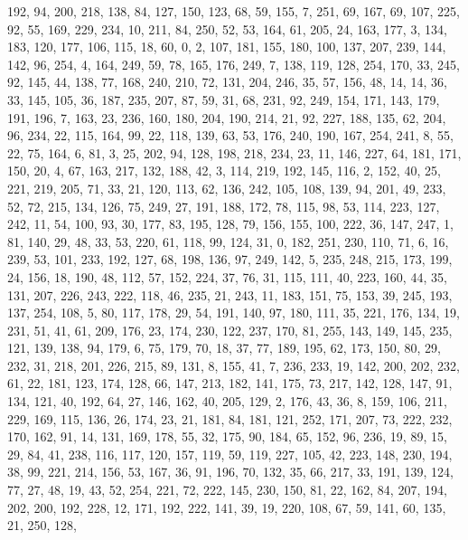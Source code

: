 \begin{DoxyCode}
       192, 94, 200, 218, 138, 84, 127, 150, 123, 68, 59, 155, 7, 251, 69, 167, 69, 107, 225, 92, 55, 169, 229, 234,
       10, 211, 84, 250, 52, 53, 164, 61, 205, 24, 163, 177, 3, 134, 183, 120, 177, 106, 115, 18, 60, 0, 2, 107,
       181, 155, 180, 100, 137, 207, 239, 144, 142, 96, 254, 4, 164, 249, 59, 78, 165, 176, 249, 7, 138, 119, 128,
       254, 170, 33, 245, 92, 145, 44, 138, 77, 168, 240, 210, 72, 131, 204, 246, 35, 57, 156, 48, 14, 14, 36, 33,
       145, 105, 36, 187, 235, 207, 87, 59, 31, 68, 231, 92, 249, 154, 171, 143, 179, 191, 196, 7, 163, 23, 236, 160,
       180, 204, 190, 214, 21, 92, 227, 188, 135, 62, 204, 96, 234, 22, 115, 164, 99, 22, 118, 139, 63, 53, 176,
       240, 190, 167, 254, 241, 8, 55, 22, 75, 164, 6, 81, 3, 25, 202, 94, 128, 198, 218, 234, 23, 11, 146, 227, 64,
       181, 171, 150, 20, 4, 67, 163, 217, 132, 188, 42, 3, 114, 219, 192, 145, 116, 2, 152, 40, 25, 221, 219,
       205, 71, 33, 21, 120, 113, 62, 136, 242, 105, 108, 139, 94, 201, 49, 233, 52, 72, 215, 134, 126, 75, 249, 27,
       191, 188, 172, 78, 115, 98, 53, 114, 223, 127, 242, 11, 54, 100, 93, 30, 177, 83, 195, 128, 79, 156, 155,
       100, 222, 36, 147, 247, 1, 81, 140, 29, 48, 33, 53, 220, 61, 118, 99, 124, 31, 0, 182, 251, 230, 110, 71, 6,
       16, 239, 53, 101, 233, 192, 127, 68, 198, 136, 97, 249, 142, 5, 235, 248, 215, 173, 199, 24, 156, 18, 190, 48,
       112, 57, 152, 224, 37, 76, 31, 115, 111, 40, 223, 160, 44, 35, 131, 207, 226, 243, 222, 118, 46, 235, 21,
       243, 11, 183, 151, 75, 153, 39, 245, 193, 137, 254, 108, 5, 80, 117, 178, 29, 54, 191, 140, 97, 180, 111, 35,
       221, 176, 134, 19, 231, 51, 41, 61, 209, 176, 23, 174, 230, 122, 237, 170, 81, 255, 143, 149, 145, 235,
       121, 139, 138, 94, 179, 6, 75, 179, 70, 18, 37, 77, 189, 195, 62, 173, 150, 80, 29, 232, 31, 218, 201, 226,
       215, 89, 131, 8, 155, 41, 7, 236, 233, 19, 142, 200, 202, 232, 61, 22, 181, 123, 174, 128, 66, 147, 213, 182,
       141, 175, 73, 217, 142, 128, 147, 91, 134, 121, 40, 192, 64, 27, 146, 162, 40, 205, 129, 2, 176, 43, 36, 8,
       159, 106, 211, 229, 169, 115, 136, 26, 174, 23, 21, 181, 84, 181, 121, 252, 171, 207, 73, 222, 232, 170, 162,
       91, 14, 131, 169, 178, 55, 32, 175, 90, 184, 65, 152, 96, 236, 19, 89, 15, 29, 84, 41, 238, 116, 117, 120,
       157, 119, 59, 119, 227, 105, 42, 223, 148, 230, 194, 38, 99, 221, 214, 156, 53, 167, 36, 91, 196, 70, 132,
       35, 66, 217, 33, 191, 139, 124, 77, 27, 48, 19, 43, 52, 254, 221, 72, 222, 145, 230, 150, 81, 22, 162, 84,
       207, 194, 202, 200, 192, 228, 12, 171, 192, 222, 141, 39, 19, 220, 108, 67, 59, 141, 60, 135, 21, 250, 128,

\end{DoxyCode}

